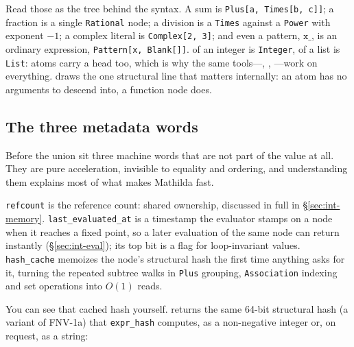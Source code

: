 
Read those as the tree behind the syntax. A sum is \texttt{Plus[a, Times[b, c]]}; a
fraction is a single \texttt{Rational} node; a division is a \texttt{Times} against a
\texttt{Power} with exponent \(-1\); a complex literal is \texttt{Complex[2, 3]}; and
even a pattern, \(\mathtt{x\_}\), is an ordinary expression,
\texttt{Pattern[x, Blank[]]}.  of an integer is \texttt{Integer}, of a list
is \texttt{List}: atoms carry a head too, which is why the same tools---,
, ---work on everything.  draws the one structural line
that matters internally: an atom has no arguments to descend into, a function node
does.

\subsection*{The three metadata words}

Before the union sit three machine words that are not part of the value at all. They
are pure acceleration, invisible to equality and ordering, and understanding them
explains most of what makes Mathilda fast.

\texttt{refcount} is the reference count: shared ownership, discussed in full in
\S\ref{sec:int-memory}. \texttt{last\_evaluated\_at} is a timestamp the evaluator
stamps on a node when it reaches a fixed point, so a later evaluation of the same
node can return instantly (\S\ref{sec:int-eval}); its top bit is a flag for
loop-invariant values. \texttt{hash\_cache} memoizes the node's structural hash the
first time anything asks for it, turning the repeated subtree walks in \texttt{Plus}
grouping, \texttt{Association} indexing and set operations into
\(O(1)\) reads.

You can see that cached hash yourself.  returns
the same 64-bit structural hash (a variant of FNV-1a) that \texttt{expr\_hash} computes,
as a non-negative integer or, on request, as a string:

